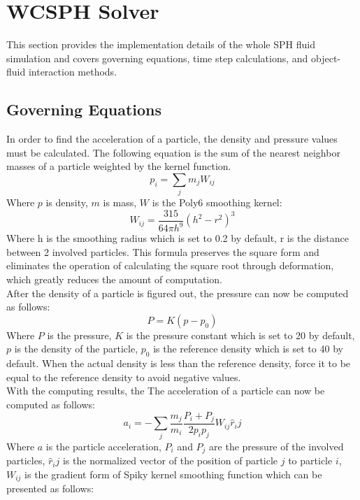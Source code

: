 \documentclass[acmtog]{acmart}
\begin{document}
\section{WCSPH Solver}
This section provides the implementation details of the whole SPH fluid simulation and covers governing equations, time step calculations, and object-fluid interaction methods.

\subsection{Governing Equations}
In order to find the acceleration of a particle, the density and pressure values must be calculated. The following equation is the sum of the nearest neighbor masses of a particle weighted by the kernel function.
\begin{equation*}
	p_i = \sum_{j} m_j W_{ij}
\end{equation*}
Where $p$ is density, $m$ is mass, $W$ is the Poly6 smoothing kernel:
\begin{equation*}
	W_{ij}=\frac{315}{64\pi h^9}(h^2-r^2)^3
\end{equation*}
Where h is the smoothing radius which is set to 0.2 by default, r is the distance between 2 involved particles. This formula preserves the square form and eliminates the operation of calculating the square root through deformation, which greatly reduces the amount of computation. \\
After the density of a particle is figured out, the pressure can now be computed as follows:
\begin{equation*}
	P = K(p-p_0)
\end{equation*}
Where $P$ is the pressure, $K$ is the pressure constant which is set to 20 by default, $p$ is the density of the particle, $p_0$ is the reference density which is set to 40 by default. When the actual density is less than the reference density, force it to be equal to the reference density to avoid negative values. \\
With the computing results, the The acceleration of a particle can now be computed as follows:
\begin{equation*}
	a_i = -\sum_{j} \frac{m_j}{m_i} \frac{P_i+P_j}{2 p_i p_j}W_{ij} \hat{r}_ij
\end{equation*}
Where $a$ is the particle acceleration, $P_i$ and $P_j$ are the pressure of the involved particles, $\hat{r}_ij$ is the normalized vector of the position of particle $j$ to particle $i$, $W_{ij}$ is the gradient form of Spiky kernel smoothing function which can be presented as follows:
\end{document}
